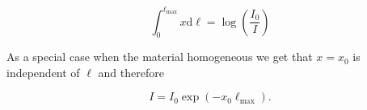 \documentclass{article}
\begin{document}
\begin{equation}
    \int_{0}^{\ell_{\max}}x \text{d} \ell = \log\left(\frac{I_0}{I}\right)
\end{equation}

As a special case when the material homogeneous we get that $x = x_0$ is independent of $\ell$ and therefore

\begin{equation}
    I = I_0 \exp{(-x_0 \ell_{\max})}.
\end{equation}


\end{document}
